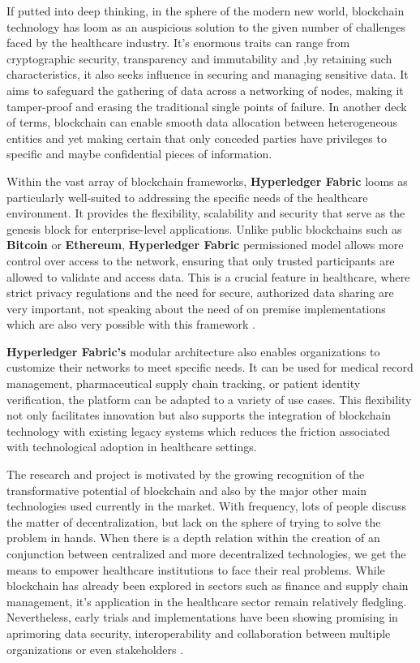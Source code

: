 If putted into deep thinking, in the sphere of the modern new world, blockchain technology has loom as an 
auspicious solution to the given number of challenges faced by the healthcare industry. It's enormous traits 
can range from cryptographic security, transparency and immutability and ,by retaining such characteristics, 
it also seeks influence in securing and managing sensitive data. It aims to safeguard the gathering of data 
across a networking of nodes, making it tamper-proof and erasing the traditional single points of failure. In 
another deck of terms, blockchain can enable smooth data allocation between heterogeneous entities and yet making 
certain that only conceded parties have privileges to specific and maybe confidential pieces of information.

Within the vast array of blockchain frameworks, \textbf{Hyperledger Fabric} looms as particularly well-suited 
to addressing the specific needs of the healthcare environment. It provides the flexibility, scalability and 
security that serve as the genesis block for enterprise-level applications. Unlike public blockchains such as 
\textbf{Bitcoin} or \textbf{Ethereum}, \textbf{Hyperledger Fabric} permissioned model allows more control over 
access to the network, ensuring that only trusted participants are allowed to validate and access data. This is
a crucial feature in healthcare, where strict privacy regulations and the need for secure, authorized data 
sharing are very important, not speaking about the need of on premise implementations which are also very possible
with this framework \cite{btc} \cite{hyperledger}.

\textbf{Hyperledger Fabric's} modular architecture also enables organizations to customize their networks to 
meet specific needs. It can be used for medical record management, pharmaceutical supply chain tracking, or 
patient identity verification, the platform can be adapted to a variety of use cases. This flexibility not only 
facilitates innovation but also supports the integration of blockchain technology with existing legacy systems 
which reduces the friction associated with technological adoption in healthcare settings.

The research and project is motivated by the growing recognition of the transformative potential of blockchain
and also by the major other main technologies used currently in the market. With frequency, lots of people discuss 
the matter of decentralization, but lack on the sphere of trying to solve the problem in hands. When there is a 
depth relation within the creation of an conjunction between centralized and more decentralized technologies, we 
get the means to empower healthcare institutions to face their real problems. While blockchain has already been 
explored in sectors such as finance and supply chain management, it's application in the healthcare sector remain 
relatively fledgling. Nevertheless, early trials and implementations have been showing promising in aprimoring 
data security, interoperability and collaboration between multiple organizations or even 
stakeholders \cite{blockchain-in-finance} \cite{blockchain-in-supply-chain}.

